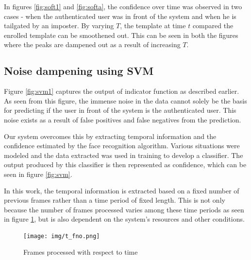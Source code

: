 \documentclass[12pt]{article}			%
\begin{document}
In figures \ref{fig:soft1} and \ref{fig:softa}, the confidence over time was observed in two cases - when the authenticated user was in front of the system and when he is tailgated by an imposter.
By varying $T$, the template at time $t$ compared the enrolled template can be smoothened out.
This can be seen in both the figures where the peaks are dampened out as a result of increasing $T$.

\begin{figure}
	\centering
	\quad
\end{figure}

\subsection{Noise dampening using SVM}
Figure \ref{fig:svm1} captures the output of indicator function as described earlier.
As seen from this figure, the immense noise in the data cannot solely be the basis for predicting if the user in front of the system is the authenticated user.
This noise exists as a result of false positives and false negatives from the prediction. 

\begin{figure}
	\centering
	\quad
\end{figure}

Our system overcomes this by extracting temporal information and the confidence estimated by the face recognition algorithm.
Various situations were modeled and the data extracted was used in training to develop a classifier.
The output produced by this classifier is then represented as confidence, which can be seen in figure \ref{fig:svm}.

In this work, the temporal information is extracted based on a fixed number of previous frames rather than a time period of fixed length.
This is not only because the number of frames processed varies among these time periods as seen in figure \ref{fig:ftime}, but is also dependent on the system's resources and other conditions.

\begin{figure}[h!]
	\centering
	\texttt{[image: img/t\_fno.png]}
	\caption{Frames processed with respect to time}
	\label{fig:ftime}
\end{figure}
\end{document}
